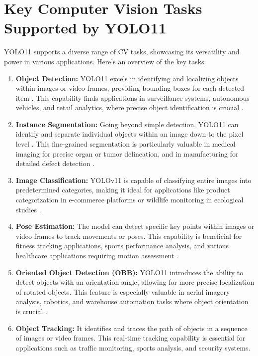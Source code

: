 \documentclass{article}
\begin{document}
\section{Key Computer Vision Tasks Supported by YOLO11}
YOLO11 supports a diverse range of CV tasks, showcasing its versatility and power in various applications. Here's an overview of the key tasks:
\begin{enumerate}
    \item \textbf{Object Detection:} YOLO11 excels in identifying and localizing objects within images or video frames, providing bounding boxes for each detected item \cite{ultralyticsisyolov112024}. This capability finds applications in surveillance systems, autonomous vehicles, and retail analytics, where precise object identification is crucial \cite{ultralyticsyolov112024}.
    \item \textbf{Instance Segmentation:} Going beyond simple detection, YOLO11 can identify and separate individual objects within an image down to the pixel level \cite{ultralyticsisyolov112024}. This fine-grained segmentation is particularly valuable in medical imaging for precise organ or tumor delineation, and in manufacturing for detailed defect detection \cite{ultralyticsyolov112024}.
    \item \textbf{Image Classification:} YOLOv11 is capable of classifying entire images into predetermined categories, making it ideal for applications like product categorization in e-commerce platforms or wildlife monitoring in ecological studies \cite{ultralyticsyolov112024}.
    \item \textbf{Pose Estimation:} The model can detect specific key points within images or video frames to track movements or poses. This capability is beneficial for fitness tracking applications, sports performance analysis, and various healthcare applications requiring motion assessment \cite{ultralyticsyolov112024}.
    \item \textbf{Oriented Object Detection (OBB):} YOLO11 introduces the ability to detect objects with an orientation angle, allowing for more precise localization of rotated objects. This feature is especially valuable in aerial imagery analysis, robotics, and warehouse automation tasks where object orientation is crucial \cite{ultralyticsyolov112024}.
    \item \textbf{Object Tracking:} It identifies and traces the path of objects in a sequence of images or video frames\cite{ultralyticsyolov112024}. This real-time tracking capability is essential for applications such as traffic monitoring, sports analysis, and security systems.
\end{enumerate}
\end{document}
